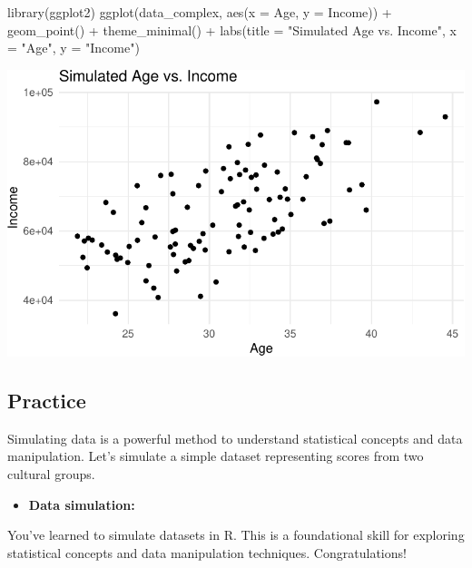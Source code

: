 \documentclass[
  singlecolumn]{article}
\newenvironment{Shaded}{}{}
\newcommand{\AttributeTok}[1]{\textcolor[rgb]{0.84,0.23,0.29}{#1}}
\newcommand{\FunctionTok}[1]{\textcolor[rgb]{0.44,0.26,0.76}{#1}}
\newcommand{\NormalTok}[1]{\textcolor[rgb]{0.14,0.16,0.18}{#1}}
\newcommand{\SpecialCharTok}[1]{\textcolor[rgb]{0.00,0.36,0.77}{#1}}
\newcommand{\StringTok}[1]{\textcolor[rgb]{0.01,0.18,0.38}{#1}}
\providecommand{\tightlist}{%
  \setlength{\itemsep}{0pt}\setlength{\parskip}{0pt}}\usepackage{longtable,booktabs,array}
\theoremstyle{definition}
\theoremstyle{remark}
\begin{document}
\begin{Shaded}
\begin{Highlighting}[]
\FunctionTok{library}\NormalTok{(ggplot2)}
\FunctionTok{ggplot}\NormalTok{(data\_complex, }\FunctionTok{aes}\NormalTok{(}\AttributeTok{x =}\NormalTok{ Age, }\AttributeTok{y =}\NormalTok{ Income)) }\SpecialCharTok{+}
  \FunctionTok{geom\_point}\NormalTok{() }\SpecialCharTok{+}
  \FunctionTok{theme\_minimal}\NormalTok{() }\SpecialCharTok{+}
  \FunctionTok{labs}\NormalTok{(}\AttributeTok{title =} \StringTok{"Simulated Age vs. Income"}\NormalTok{, }\AttributeTok{x =} \StringTok{"Age"}\NormalTok{, }\AttributeTok{y =} \StringTok{"Income"}\NormalTok{)}
\end{Highlighting}
\end{Shaded}

\includegraphics{02-content_files/figure-pdf/unnamed-chunk-20-1.pdf}

\subsection{Practice}\label{practice}

Simulating data is a powerful method to understand statistical concepts
and data manipulation. Let's simulate a simple dataset representing
scores from two cultural groups.

\begin{itemize}
\tightlist
\item
  \textbf{Data simulation:}
\end{itemize}

You've learned to simulate datasets in R. This is a foundational skill
for exploring statistical concepts and data manipulation techniques.
Congratulations!
\end{document}
